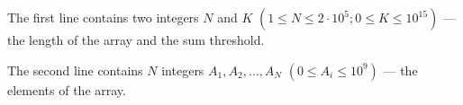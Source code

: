 The first line contains two integers $N$ and $K$ $(1 \le N \le 2 \cdot 10^5; 0 \le K \le 10^{15})$ --- the length of the array and the sum threshold.

The second line contains $N$ integers $A_1, A_2, \ldots, A_N$ $(0 \le A_i \le 10^9)$ --- the elements of the array.